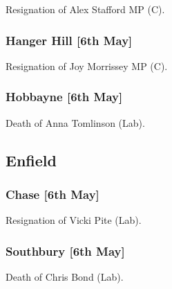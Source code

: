 \documentclass[a4paper,openany]{book}
\begin{document}
\begin{resultsiii}

Resignation of Alex Stafford MP (C).

\subsubsection*{Hanger Hill \hspace*{\fill}\nolinebreak[1]%
	\enspace\hspace*{\fill}
	[6th May]}


Resignation of Joy Morrissey MP (C).

\subsubsection*{Hobbayne \hspace*{\fill}\nolinebreak[1]%
	\enspace\hspace*{\fill}
	[6th May]}


Death of Anna Tomlinson (Lab).

\subsection*{Enfield}

\subsubsection*{Chase \hspace*{\fill}\nolinebreak[1]%
	\enspace\hspace*{\fill}
	[6th May]}


Resignation of Vicki Pite (Lab).

\subsubsection*{Southbury \hspace*{\fill}\nolinebreak[1]%
	\enspace\hspace*{\fill}
	[6th May]}


Death of Chris Bond (Lab).


\end{resultsiii}
\end{document}
